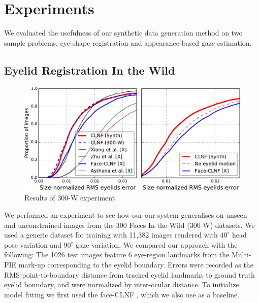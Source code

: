 
\section{Experiments}


% 

We evaluated the usefulness of our synthetic data generation method on two sample problems, eye-shape registration and appearance-based gaze estimation.


\subsection{Eyelid Registration In the Wild}

\begin{figure}
    \centering
    \includegraphics[width=\columnwidth]{figs/CLNF_300W_experiment.pdf}
    \caption{Results of 300-W experiment}
    \label{fig:clnf_results_wild}
\end{figure}



We performed an experiment to see how our our system generalises on unseen and unconstrained images from the 300 Faces In-the-Wild (300-W) \cite{sagonas2013300} datasets.
We used a generic \dataset dataset for training with 11,382 images rendered with $40^{\circ}$ head pose variation and $90^{\circ}$ gaze variation.
We compared our approach with the following: 
The 1026 test images feature 6 eye-region landmarks from the Multi-PIE \cite{gross2010multi} mark-up corresponding to the eyelid boundary. Errors were recorded as the RMS point-to-boundary distance from tracked eyelid landmarks to ground truth eyelid boundary, and were normalized by inter-ocular distance.
To initialize model fitting we first used the face-CLNF \cite{baltrusaitis2013constrained}, which we also use as a baseline.

